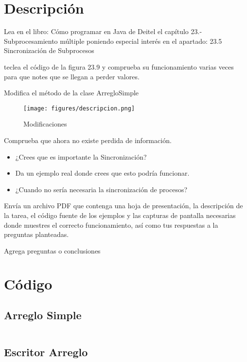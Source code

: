 \documentclass[12pt]{article}
\author{Pablo Vargas Bermúdez}
\begin{document}
\pagestyle{empty}



\section*{Descripción}

Lea en el libro: Cómo programar en Java de Deitel el capítulo 23.-
Subprocesamiento múltiple poniendo especial interés en el apartado:
23.5 Sincronización de Subprocesos

teclea el código de la figura 23.9 y comprueba su funcionamiento
varias veces para que notes que se llegan a perder valores.

Modifica el método de la clase ArregloSimple

\begin{figure}[ht!]
  \centering
  \texttt{[image: figures/descripcion.png]}
  \caption{Modificaciones}
\end{figure}


Comprueba que ahora no existe perdida de información.

\begin{itemize}
\item ¿Crees que es importante la Sincronización?
\item Da un ejemplo real donde crees que esto podría funcionar.
\item ¿Cuando no sería necesaria la sincronización de procesos?
\end{itemize}

Envía un archivo PDF que contenga una hoja de presentación, la
descripción de la tarea, el código fuente de los ejemplos y las
capturas de pantalla necesarias donde muestres el correcto
funcionamiento, así como tus respuestas a la preguntas planteadas.

Agrega preguntas o conclusiones

\section*{Código}

\subsection*{Arreglo Simple}
\inputminted{Java}{ArregloSimple.java}
\subsection*{Escritor Arreglo}
\inputminted{Java}{EscritorArreglo.java}
\end{document}
